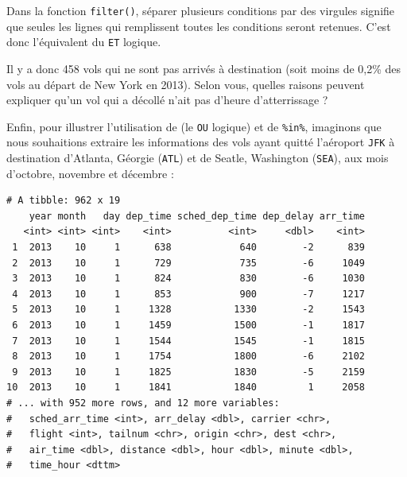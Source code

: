 \documentclass[a4paperpaper,]{article}
\newenvironment{Shaded}{\begin{snugshade}}{\end{snugshade}}
\newcommand{\DecValTok}[1]{\textcolor[rgb]{0.69,0.50,0.00}{#1}}
\newcommand{\KeywordTok}[1]{\textcolor[rgb]{0.12,0.11,0.11}{\textbf{#1}}}
\newcommand{\NormalTok}[1]{\textcolor[rgb]{0.12,0.11,0.11}{#1}}
\newcommand{\OperatorTok}[1]{\textcolor[rgb]{0.12,0.11,0.11}{#1}}
\newcommand{\StringTok}[1]{\textcolor[rgb]{0.75,0.01,0.01}{#1}}
\begin{document}
Dans la fonction \texttt{filter()}, séparer plusieurs conditions par des virgules signifie que seules les lignes qui remplissent toutes les conditions seront retenues. C'est donc l'équivalent du \texttt{ET} logique.

Il y a donc 458 vols qui ne sont pas arrivés à destination (soit moins de 0,2\% des vols au départ de New York en 2013). Selon vous, quelles raisons peuvent expliquer qu'un vol qui a décollé n'ait pas d'heure d'atterrissage ?

Enfin, pour illustrer l'utilisation de \texttt{\textbar{}} (le \texttt{OU} logique) et de \texttt{\%in\%}, imaginons que nous souhaitions extraire les informations des vols ayant quitté l'aéroport \texttt{JFK} à destination d'Atlanta, Géorgie (\texttt{ATL}) et de Seatle, Washington (\texttt{SEA}), aux mois d'octobre, novembre et décembre :

\begin{Shaded}
\end{Shaded}

\begin{verbatim}
# A tibble: 962 x 19
    year month   day dep_time sched_dep_time dep_delay arr_time
   <int> <int> <int>    <int>          <int>     <dbl>    <int>
 1  2013    10     1      638            640        -2      839
 2  2013    10     1      729            735        -6     1049
 3  2013    10     1      824            830        -6     1030
 4  2013    10     1      853            900        -7     1217
 5  2013    10     1     1328           1330        -2     1543
 6  2013    10     1     1459           1500        -1     1817
 7  2013    10     1     1544           1545        -1     1815
 8  2013    10     1     1754           1800        -6     2102
 9  2013    10     1     1825           1830        -5     2159
10  2013    10     1     1841           1840         1     2058
# ... with 952 more rows, and 12 more variables:
#   sched_arr_time <int>, arr_delay <dbl>, carrier <chr>,
#   flight <int>, tailnum <chr>, origin <chr>, dest <chr>,
#   air_time <dbl>, distance <dbl>, hour <dbl>, minute <dbl>,
#   time_hour <dttm>
\end{verbatim}
\end{document}
